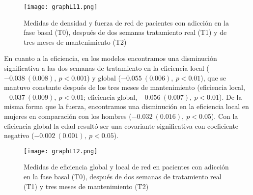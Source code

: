 \begin{figure}[!htb]
    \centering
    \texttt{[image: graphL11.png]}
    \caption{Medidas de densidad y fuerza de red de pacientes con adicción en la fase basal (T0), después de dos semanas tratamiento real (T1) y de tres meses de mantenimiento (T2)}
    \label{fig:gpL11}
\end{figure}

En cuanto a la eficiencia, en los modelos encontramos una disminución significativa a las dos semanas de tratamiento en la eficiencia local ($-0.038\ (0.008),\ p<0.001$) y global ($-0.055\ (0.006),\ p<0.01$), que se mantuvo constante después de los tres meses de mantenimiento (eficiencia local, $-0.037\ (0.009),\ p<0.01$; eficiencia global, $-0.056\ (0.007),\ p<0.01$). De la misma forma que la fuerza, encontramos una disminución en la eficiencia local en mujeres en comparación con los hombres ($-0.032\ (0.016),\ p<0.05$). Con la eficiencia global la edad resultó ser una covariante significativa con coeficiente negativo ($-0.002\ (0.001),\ p<0.05$).

\begin{figure}[!htb]
    \centering
    \texttt{[image: graphL12.png]}
    \caption{Medidas de eficiencia global y local de red en pacientes con adicción en la fase basal (T0), después de dos semanas de tratamiento real (T1) y tres meses de mantenimiento (T2)}
    \label{fig:gpL12}
\end{figure}


